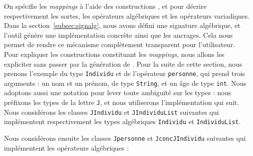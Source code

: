 On spécifie les \emph{mappings} à l'aide des constructions {\tom}
,
 et 
pour décrire respectivement les sortes, les opérateurs algébriques et les
opérateurs variadiques. Dans la section~\ref{subsec:signalg}, nous avons défini
une signature algébrique, et l'outil {\gom} génère une
implémentation concrète ainsi que les ancrages. Cela nous permet de rendre
ce mécanisme complètement transparent pour l'utilisateur. Pour expliquer les
constructions constituant les \emph{mappings}, nous allons les expliciter 
sans passer par la génération de {\gom}. Pour la suite de cette section, nous
prenons l'exemple du type \texttt{Individu} et de l'opérateur
\texttt{personne}, qui prend trois arguments : un nom et un prénom, de type
\texttt{String}, et un âge de type \texttt{int}. Nous adoptons aussi une
notation pour lever toute ambiguïté sur les types : nous préfixons les types
{\java} de la lettre \texttt{J}, et nous utiliserons l'implémentation qui suit.
Nous considérons les classes {\java} \texttt{JIndividu} et \texttt{JIndividuList}
suivantes qui implémentent respectivement les types algébriques
\texttt{Individu} et \texttt{IndividuList}.



Nous considérons ensuite les classes {\java} \texttt{Jpersonne} et
\texttt{JconcJIndividu} suivantes qui implémentent les opérateurs algébriques :


